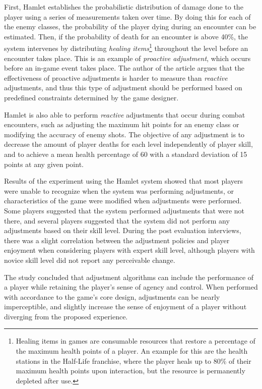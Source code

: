 \documentclass[cic,tc,english]{iiufrgs}
\begin{document}
First, Hamlet establishes the probabilistic distribution of damage done to the player using a series of measurements taken over time. By doing this for each of the enemy classes, the probability of the player dying during an encounter can be estimated. Then, if the probability of death for an encounter is above 40\%, the system intervenes by distributing \emph{healing items}\footnote{Healing items in games are consumable resources that restore a percentage of the maximum health points of a player. An example for this are the health stations in the Half-Life franchise, where the player heals up to 80\% of their maximum health points upon interaction, but the resource is permanently depleted after use.} throughout the level before an encounter takes place. This is an example of \emph{proactive adjustment}, which occurs before an in-game event takes place. The author of the article argues that the effectiveness of proactive adjustments is harder to measure than \emph{reactive} adjustments, and thus this type of adjustment should be performed based on predefined constraints determined by the game designer.

Hamlet is also able to perform \emph{reactive} adjustments that occur during combat encounters, such as adjusting the maximum hit points for an enemy class or modifying the accuracy of enemy shots. The objective of any adjustment is to decrease the amount of player deaths for each level independently of player skill, and to achieve a mean health percentage of 60 with a standard deviation of 15 points at any given point.

Results of the experiment using the Hamlet system showed that most players were unable to recognize when the system was performing adjustments, or characteristics of the game were modified when adjustments were performed. Some players suggested that the system performed adjustments that were not there, and several players suggested that the system did not perform any adjustments based on their skill level. During the post evaluation interviews, there was a slight correlation between the adjustment policies and player enjoyment when considering players with expert skill level, although players with novice skill level did not report any perceivable change.

The study concluded that adjustment algorithms can include the performance of a player while retaining the player's sense of agency and control. When performed with accordance to the game's core design, adjustments can be nearly imperceptible, and slightly increase the sense of enjoyment of a player without diverging from the proposed experience.
\end{document}
